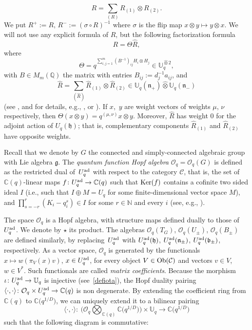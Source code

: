 \documentclass[pdftex]{sigma}
\numberwithin{equation}{section}
\theoremstyle{definition}
\newcommand{\Oq}{\Oo_{q}}
\newcommand{\mUq}{\mathbb{U}_q}
\newcommand{\mc}{\mathbb{C}}
\newcommand{\Oo}{{\mathcal O}}
\newcommand{\ra}{\rightarrow}
\begin{document}
\begin{equation}\label{Rcat}
R=\sum_{(R)}R_{(1)}\otimes R_{(2)}.
\end{equation}
We put $R^+:=R$, $R^- := (\sigma\circ R)^{-1}$ where $\sigma$ is the flip map $x\otimes y \mapsto y\otimes x$. We will not use any explicit formula of $R$, but the following factorization formula
\begin{equation}\label{Rmatfact}
R=\Theta \hat{R},
\end{equation}
where
\[\Theta = q^{\sum_{i,j=1}^m (B^{-1})_{ij} H_i\otimes H_j} \in \mUq^{\hat{\otimes} 2},\]
with $B\in M_m(\mathbb{Q})$ the matrix with entries $B_{ij}:=d_j^{-1}a_{ij}$, and
\[\hat{R}=\sum_{(\hat{R})} \hat{R}_{(1)} \otimes \hat{R}_{(2)}\in \mUq(\mathfrak{n}_+)\hat{\otimes} \mUq(\mathfrak{n}_-)\]
(see \cite[Section 3.2]{BR}, and for details, e.g., \cite[Theorem 8.3.9]{CP}, or \cite[Theorem 3.108]{VY}). If $x$,~$y$ are weight vectors of weights $\mu$, $\nu$ respectively, then $\Theta(x\otimes y) = q^{(\mu,\nu)} x\otimes y$. Moreover, $\hat{R}$ has weight $0$ for the adjoint action of $U_q(\mathfrak{h})$; that is, complementary components $\hat{R}_{(1)}$ and $\hat{R}_{(2)}$ have opposite weights.


Recall that we denote by $G$ the connected and simply-connected algebraic group with Lie algebra $\mathfrak{g}$. The {\it quantum function Hopf algebra} $\Oo_q=\Oo_q(G)$ is defined as the restricted dual of~$U_q^{\rm ad}$ with respect to the category $\mathcal{C}$, that is, the set of ${\mathbb C}(q)$-linear maps $f\colon U_q^{\rm ad}\ra \mc(q)$ such that ${\rm Ker}(f)$ contains a cofinite two sided ideal $I$ (i.e., such that $I\oplus M =U_q$ for some finite-dimensional vector space $M$), and $ \prod_{s=-r}^r (K_i - q_i^s) \in I$ for some $r\in \mathbb{N}$ and every $i$ (see, e.g., \cite[Chapter I.7]{BG}).

The space $\Oo_q$ is a Hopf algebra, with structure maps defined dually to those of $U_q^{\rm ad}$. We denote by $\star$ its product. The algebras $\Oo_q(T_G)$, $\Oo_q(U_\pm)$, $\Oo_q(B_\pm)$ are defined similarly, by replacing~$U_q^{\rm ad}$ with $U_q^{\rm ad}(\mathfrak{h})$, $U_q^{\rm ad}(\mathfrak{n}_\pm)$, $U_q^{\rm ad}(\mathfrak{b}_\pm)$, respectively. As a vector space, $\Oq$ is generated by the functionals $x\mapsto w(\pi_V(x)v)$, $x\in U_q^{\rm ad}$, for every object $V\in {\rm Ob}(\mathcal{C})$ and vectors $v\in V$, $w\in V^*$. Such functionals are called {\it matrix coefficients}. Because the morphism $\iota\colon U_q^{\rm ad}\to \mathbb{U}_q$ is injective (see~\eqref{defiota}), the Hopf duality pairing $\langle\cdot,\cdot\rangle \colon \Oq \times U_q^{\rm ad} \ra \mc(q)$ is non degenerate. By extending the coefficient ring from $\mc(q)$ to $\mc\big(q^{1/D}\big)$, we can uniquely extend it to a bilinear pairing
\[\langle\cdot,\cdot\rangle\colon\ \big(\Oq \bigotimes_{{\mathbb C}(q)} {\mathbb C}\big(q^{1/D}\big)\big)\times \mUq \ra \mc\big(q^{1/D}\big)\]
such that the following diagram is commutative:
\end{document}

